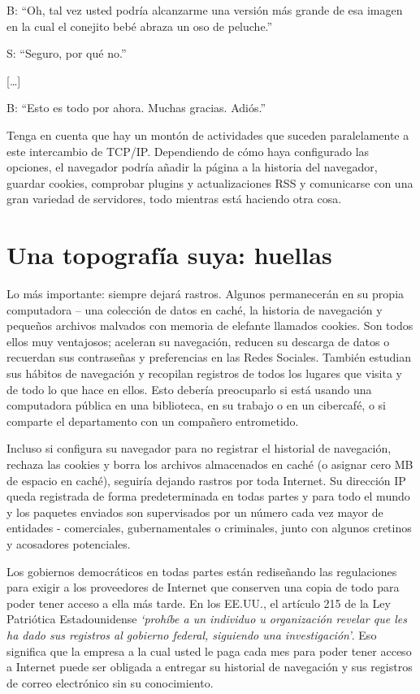 \documentclass[10pt,a5paper,twoside,,]{book}
\begin{document}
B: ``Oh, tal vez usted podría alcanzarme una versión más grande de esa
imagen en la cual el conejito bebé abraza un oso de peluche.''

S: ``Seguro, por qué no.''

{[}\ldots{}{]}

B: ``Esto es todo por ahora. Muchas gracias. Adiós.''

Tenga en cuenta que hay un montón de actividades que suceden
paralelamente a este intercambio de TCP/IP. Dependiendo de cómo haya
configurado las opciones, el navegador podría añadir la página a la
historia del navegador, guardar cookies, comprobar plugins y
actualizaciones RSS y comunicarse con una gran variedad de servidores,
todo mientras está haciendo otra cosa.

\section{Una topografía suya:
huellas}\label{una-topografuxeda-suya-huellas}

Lo más importante: siempre dejará rastros. Algunos permanecerán en su
propia computadora -- una colección de datos en caché, la historia de
navegación y pequeños archivos malvados con memoria de elefante llamados
cookies. Son todos ellos muy ventajosos; aceleran su navegación, reducen
su descarga de datos o recuerdan sus contraseñas y preferencias en las
Redes Sociales. También estudian sus hábitos de navegación y recopilan
registros de todos los lugares que visita y de todo lo que hace en
ellos. Esto debería preocuparlo si está usando una computadora pública
en una biblioteca, en su trabajo o en un cibercafé, o si comparte el
departamento con un compañero entrometido.

Incluso si configura su navegador para no registrar el historial de
navegación, rechaza las cookies y borra los archivos almacenados en
caché (o asignar cero MB de espacio en caché), seguiría dejando rastros
por toda Internet. Su dirección IP queda registrada de forma
predeterminada en todas partes y para todo el mundo y los paquetes
enviados son supervisados por un número cada vez mayor de entidades -
comerciales, gubernamentales o criminales, junto con algunos cretinos y
acosadores potenciales.

Los gobiernos democráticos en todas partes están rediseñando las
regulaciones para exigir a los proveedores de Internet que conserven una
copia de todo para poder tener acceso a ella más tarde. En los EE.UU.,
el artículo 215 de la Ley Patriótica Estadounidense \emph{`prohíbe a un
individuo u organización revelar que les ha dado sus registros al
gobierno federal, siguiendo una investigación'}. Eso significa que la
empresa a la cual usted le paga cada mes para poder tener acceso a
Internet puede ser obligada a entregar su historial de navegación y sus
registros de correo electrónico sin su conocimiento.
\end{document}
